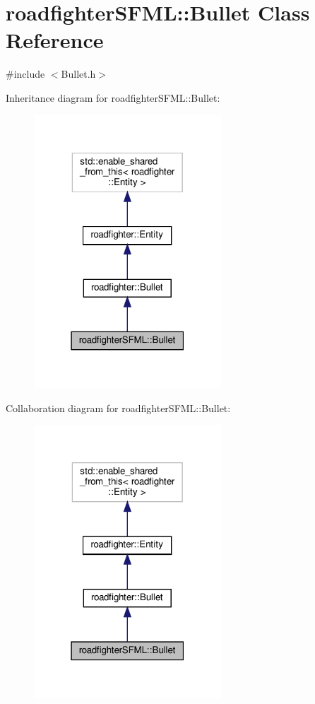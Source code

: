 \hypertarget{classroadfighterSFML_1_1Bullet}{}\section{roadfighter\+S\+F\+ML\+:\+:Bullet Class Reference}
\label{classroadfighterSFML_1_1Bullet}


{\ttfamily \#include $<$Bullet.\+h$>$}



Inheritance diagram for roadfighter\+S\+F\+ML\+:\+:Bullet\+:\nopagebreak
\begin{figure}[H]
\begin{center}
\leavevmode
\includegraphics[width=199pt]{classroadfighterSFML_1_1Bullet__inherit__graph}
\end{center}
\end{figure}


Collaboration diagram for roadfighter\+S\+F\+ML\+:\+:Bullet\+:\nopagebreak
\begin{figure}[H]
\begin{center}
\leavevmode
\includegraphics[width=199pt]{classroadfighterSFML_1_1Bullet__coll__graph}
\end{center}
\end{figure}
